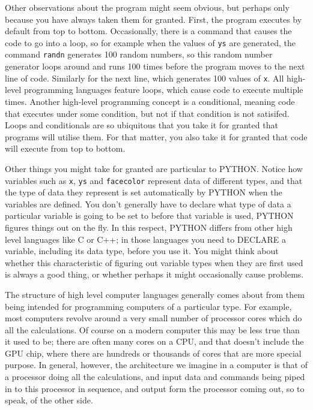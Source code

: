 \documentclass[../physical_computing.tex]{subfiles}
\begin{document}
Other observations about the program might seem obvious, but perhaps only because you have always taken them for granted. First, the program executes by default from top to bottom. Occasionally, there is a command that causes the code to go into a loop, so for example when the values of \texttt{ys} are generated, the
command \texttt{randn} generates 100 random numbers, so this random number 
generator loops around and runs 100 times before the program moves to the next
line of code. Similarly for the next line, which generates 100 values of \texttt{x}. All high-level programming languages feature loops, which cause code to execute multiple times. Another high-level programming concept is a conditional, meaning code that executes under some condition, but not if that condition is not satisifed. Loops and conditionals are so ubiquitous that you take it for granted that programs will utilise them. For that matter, you also take it for granted that code will execute from top to bottom.

Other things you might take for granted are particular to PYTHON. Notice how variables such as \texttt{x}, \texttt{ys} and \texttt{facecolor} represent data of different types, and that the type of data they represent is set automatically by PYTHON when the variables are defined. You don't generally have to declare what type of data a particular variable is going to be set to before that variable is used, PYTHON figures things out on the fly. In this respect, PYTHON differs from other high level languages like C or C++; in those languages you need to DECLARE a variable, including its data type, before you use it. You might think about whether this characteristic of figuring out variable types when they are first used is always a good thing, or whether perhaps it might occasionally cause problems.

The structure of high level computer languages generally comes about from them being intended for programming computers of a particular type. For example, most computers revolve around a very small number of processor cores which do all the calculations. Of course on a modern computer this may be less true than it used to be; there are often many cores on a CPU, and that doesn't include the GPU chip, where there are hundreds or thousands of cores that are more special purpose. In general, however, the architecture we imagine in a computer is that of a processor doing all the calculations, and input data and commands being piped in to this processor in sequence, and output form the processor coming out, so to speak, of the other side.
\end{document}
